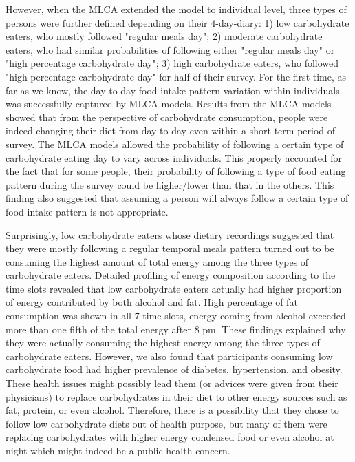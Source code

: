 However, when the MLCA extended the model to individual level, three types of persons were further defined depending on their 4-day-diary: 1) low carbohydrate eaters, who mostly followed "regular meals day"; 2) moderate carbohydrate eaters, who had similar probabilities of following either "regular meals day" or "high percentage carbohydrate day"; 3) high carbohydrate eaters, who followed "high percentage carbohydrate day" for half of their survey. For the first time, as far as we know, the day-to-day food intake pattern variation within individuals was successfully captured by MLCA models. Results from the MLCA models showed that from the perspective of carbohydrate consumption, people were indeed changing their diet from day to day even within a short term period of survey. The MLCA models allowed the probability of following a certain type of carbohydrate eating day to vary across individuals. This properly accounted for the fact that for some people, their probability of following a type of food eating pattern during the survey could be higher/lower than that in the others. This finding also suggested that assuming a person will always follow a certain type of food intake pattern is not appropriate.

Surprisingly, low carbohydrate eaters whose dietary recordings suggested that they were mostly following a regular temporal meals pattern turned out to be consuming the highest amount of total energy among the three types of carbohydrate eaters. Detailed profiling of energy composition according to the time slots revealed that low carbohydrate eaters actually had higher proportion of energy contributed by both alcohol and fat. High percentage of fat consumption was shown in all 7 time slots, energy coming from alcohol exceeded more than one fifth of the total energy after 8 pm. These findings explained why they were actually consuming the highest energy among the three types of carbohydrate eaters. However, we also found that participants consuming low carbohydrate food had higher prevalence of diabetes, hypertension, and obesity. These health issues might possibly lead them (or advices were given from their physicians) to replace carbohydrates in their diet to other energy sources such as fat, protein, or even alcohol. Therefore, there is a possibility that they chose to follow low carbohydrate diets out of health purpose, but many of them were replacing carbohydrates with higher energy condensed food or even alcohol at night which might indeed be a public health concern. 

